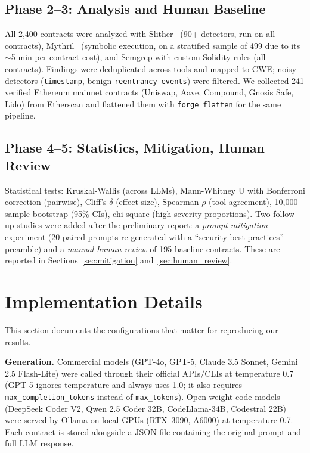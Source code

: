 \documentclass[11pt]{article}
\begin{document}
\subsection{Phase 2--3: Analysis and Human Baseline}

All 2,400 contracts were analyzed with Slither~\cite{slither} (90+ detectors, run on all contracts), Mythril~\cite{mythril} (symbolic execution, on a stratified sample of 499 due to its $\sim$5 min per-contract cost), and Semgrep with custom Solidity rules (all contracts). Findings were deduplicated across tools and mapped to CWE; noisy detectors (\texttt{timestamp}, benign \texttt{reentrancy-events}) were filtered. We collected 241 verified Ethereum mainnet contracts (Uniswap, Aave, Compound, Gnosis Safe, Lido) from Etherscan and flattened them with \texttt{forge flatten} for the same pipeline.

\subsection{Phase 4--5: Statistics, Mitigation, Human Review}

Statistical tests: Kruskal-Wallis (across LLMs), Mann-Whitney U with Bonferroni correction (pairwise), Cliff's $\delta$ (effect size), Spearman $\rho$ (tool agreement), 10,000-sample bootstrap (95\% CIs), chi-square (high-severity proportions). Two follow-up studies were added after the preliminary report: a \emph{prompt-mitigation} experiment (20 paired prompts re-generated with a ``security best practices'' preamble) and a \emph{manual human review} of 195 baseline contracts. These are reported in Sections~\ref{sec:mitigation} and~\ref{sec:human_review}.

\section{Implementation Details}
\label{sec:implementation}

This section documents the configurations that matter for reproducing our results.

\textbf{Generation.} Commercial models (GPT-4o, GPT-5, Claude 3.5 Sonnet, Gemini 2.5 Flash-Lite) were called through their official APIs/CLIs at temperature 0.7 (GPT-5 ignores temperature and always uses 1.0; it also requires \texttt{max\_completion\_tokens} instead of \texttt{max\_tokens}). Open-weight code models (DeepSeek Coder V2, Qwen 2.5 Coder 32B, CodeLlama-34B, Codestral 22B) were served by Ollama on local GPUs (RTX~3090, A6000) at temperature 0.7. Each contract is stored alongside a JSON file containing the original prompt and full LLM response.
\end{document}
